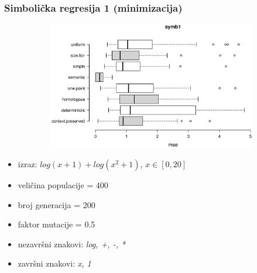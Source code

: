 \documentclass{beamer}
\begin{document}
\begin{frame}
\frametitle{Simbolička regresija 1 (minimizacija)}


\begin{figure}[!htb]
\begin{figure}[H]
	\centering
	\includegraphics[trim=4cm 5.5cm 0cm 3.5cm, scale=0.3]{./boxPlots/symb1.eps}
\end{figure}

\endminipage
{}
\endminipage
\end{figure}

\begin{itemize}
\item{izraz: $log(x+1)+log(x^2+1)$, $x \in [0, 20]$}
\item{veličina populacije = 400}
\item{broj generacija = 200}
\item{faktor mutacije = 0.5}
\item{nezavršni znakovi: \textit{log, +, -, *}}
\item{završni znakovi: \textit{x, 1}}
\end{itemize}
\end{frame}
\end{document}
